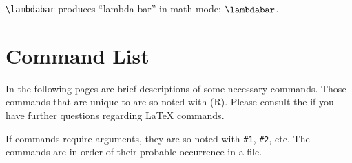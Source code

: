  \verb+\lambdabar+ produces ``lambda-bar'' in math mode: $\lambdabar$.

\onecolumn


\makeatletter
{}
\def\thepage{B-\@arabic\c@page}
\makeatother


\section{Command List}
\label{sec:commands}

In the following pages are brief descriptions of some
necessary commands.
Those commands that are unique to \REVTeX{} are so noted
with (R). Please consult the \LUG{} if you have further questions
regarding \LaTeX{} commands.

If commands require arguments, they are so noted
with \verb+#1+, \verb+#2+, etc.
The commands are in order of their probable occurrence in a file.

